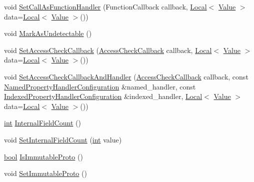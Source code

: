 \begin{DoxyCompactItemize}
\item 
void \mbox{\hyperlink{classv8_1_1ObjectTemplate_a1775c8f73e643c339804d2f5b628eddf}{Set\+Call\+As\+Function\+Handler}} (Function\+Callback callback, \mbox{\hyperlink{classv8_1_1Local}{Local}}$<$ \mbox{\hyperlink{classv8_1_1Value}{Value}} $>$ data=\mbox{\hyperlink{classv8_1_1Local}{Local}}$<$ \mbox{\hyperlink{classv8_1_1Value}{Value}} $>$())
\item 
void \mbox{\hyperlink{classv8_1_1ObjectTemplate_a7e40ef313b44c2ad336c73051523b4f8}{Mark\+As\+Undetectable}} ()
\item 
void \mbox{\hyperlink{classv8_1_1ObjectTemplate_a5b0337016cd89fc72f3a9d75399c2487}{Set\+Access\+Check\+Callback}} (\mbox{\hyperlink{namespacev8_a1024fb358d107c1494163217830688e6}{Access\+Check\+Callback}} callback, \mbox{\hyperlink{classv8_1_1Local}{Local}}$<$ \mbox{\hyperlink{classv8_1_1Value}{Value}} $>$ data=\mbox{\hyperlink{classv8_1_1Local}{Local}}$<$ \mbox{\hyperlink{classv8_1_1Value}{Value}} $>$())
\item 
void \mbox{\hyperlink{classv8_1_1ObjectTemplate_abb8302671bfb5d381f7415336f4e631d}{Set\+Access\+Check\+Callback\+And\+Handler}} (\mbox{\hyperlink{namespacev8_a1024fb358d107c1494163217830688e6}{Access\+Check\+Callback}} callback, const \mbox{\hyperlink{structv8_1_1NamedPropertyHandlerConfiguration}{Named\+Property\+Handler\+Configuration}} \&named\+\_\+handler, const \mbox{\hyperlink{structv8_1_1IndexedPropertyHandlerConfiguration}{Indexed\+Property\+Handler\+Configuration}} \&indexed\+\_\+handler, \mbox{\hyperlink{classv8_1_1Local}{Local}}$<$ \mbox{\hyperlink{classv8_1_1Value}{Value}} $>$ data=\mbox{\hyperlink{classv8_1_1Local}{Local}}$<$ \mbox{\hyperlink{classv8_1_1Value}{Value}} $>$())
\item 
\mbox{\hyperlink{classint}{int}} \mbox{\hyperlink{classv8_1_1ObjectTemplate_a43de785d594d8c01b18230b1aa79e31c}{Internal\+Field\+Count}} ()
\item 
void \mbox{\hyperlink{classv8_1_1ObjectTemplate_ab63916ac584a76bca8ba541f86ce9fce}{Set\+Internal\+Field\+Count}} (\mbox{\hyperlink{classint}{int}} value)
\item 
\mbox{\hyperlink{classbool}{bool}} \mbox{\hyperlink{classv8_1_1ObjectTemplate_a76c12ee7be283bd3b007d062686dc0ed}{Is\+Immutable\+Proto}} ()
\item 
void \mbox{\hyperlink{classv8_1_1ObjectTemplate_adba49230a24b42f0985494ac86655e54}{Set\+Immutable\+Proto}} ()
\end{DoxyCompactItemize}
